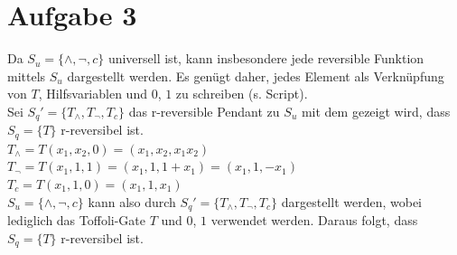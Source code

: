 \documentclass[a4paper]{scrartcl}
\begin{document}
\newpage
\section*{Aufgabe 3}
Da $S_u=\{\wedge, \neg, c\}$ universell ist, kann insbesondere jede reversible Funktion mittels $S_u$ dargestellt werden. Es genügt daher, jedes Element als Verknüpfung von $T$, Hilfsvariablen und $0$, $1$ zu
schreiben (s. Script).\\
Sei $S_q' = \{T_{\wedge},T_{\neg},T_{c}\}$ das r-reversible Pendant zu $S_u$ mit dem gezeigt wird, dass $S_q = \{T\}$ r-reversibel ist.\\
$T_{\wedge} = T(x_1,x_2,0) = (x_1,x_2,x_1x_2)$\\
$T_{\neg} = T(x_1,1,1) = (x_1,1,1+x_1) = (x_1,1,-x_1)$\\
$T_{c} = T(x_1,1,0) = (x_1,1,x_1)$\\
$S_u=\{\wedge, \neg, c\}$ kann also durch $S_q' = \{T_{\wedge},T_{\neg},T_{c}\}$ dargestellt werden, wobei lediglich das Toffoli-Gate $T$ und $0$, $1$ verwendet werden. Daraus folgt, dass $S_q = \{T\}$ r-reversibel ist.


\newpage
\end{document}
